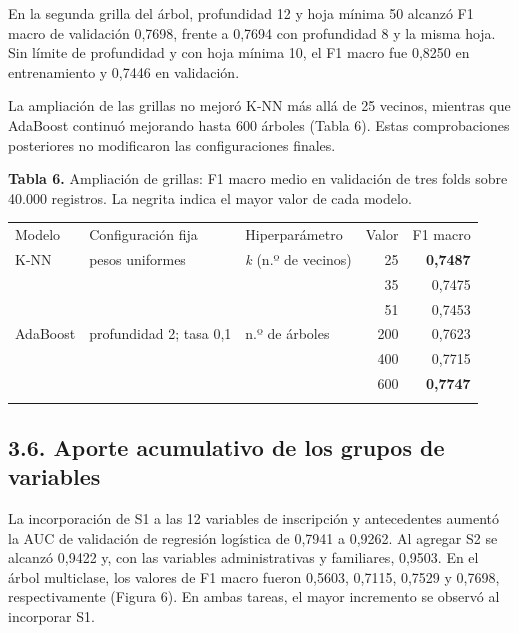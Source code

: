 \documentclass[10pt,a4paper]{article}
\newenvironment{tabla}{\par\begingroup\small
  \setlength{\LTpre}{2pt}\setlength{\LTpost}{2pt}\setlength{\tabcolsep}{4.5pt}
  \renewcommand{\arraystretch}{1.08}}{\endgroup\par}
\newcommand{\epigrafetabla}[1]{\noindent\begin{minipage}{\linewidth}\small\justifying\noindent #1\end{minipage}\par\vspace{2pt}}
\renewcommand{\toprule}{\specialrule{1pt}{2pt}{2pt}}
\renewcommand{\bottomrule}{\specialrule{1pt}{2pt}{0pt}}
\renewcommand{\midrule}{\specialrule{.5pt}{2pt}{2pt}}
\begin{document}
En la segunda grilla del árbol, profundidad 12 y hoja mínima 50 alcanzó F1 macro de validación 0,7698, frente a 0,7694 con profundidad 8 y la misma
hoja. Sin límite de profundidad y con hoja mínima 10, el F1 macro fue 0,8250 en entrenamiento y 0,7446 en validación.

La ampliación de las grillas no mejoró K-NN más allá de 25 vecinos, mientras que AdaBoost continuó mejorando hasta 600 árboles (Tabla 6). Estas
comprobaciones posteriores no modificaron las configuraciones finales.

\begin{table}[!htbp]
\begin{tabla}
\epigrafetabla{\textbf{Tabla 6.} Ampliación de grillas: F1 macro medio en validación de
tres folds sobre 40.000 registros. La negrita indica el mayor valor de
cada modelo.}
\begin{tabular*}{\linewidth}{@{\extracolsep{\fill}}lllrr@{}}
\toprule\noalign{}
Modelo & Configuración fija & Hiperparámetro & Valor & F1 macro \\
\midrule\noalign{}
K-NN & pesos uniformes & \emph{k} (n.º de vecinos) & 25 &
\textbf{0,7487} \\
& & & 35 & 0,7475 \\
& & & 51 & 0,7453 \\
AdaBoost & profundidad 2; tasa 0,1 & n.º de árboles & 200 & 0,7623 \\
& & & 400 & 0,7715 \\
& & & 600 & \textbf{0,7747} \\
\bottomrule
\end{tabular*}
\end{tabla}
\end{table}

\hypertarget{aporte-acumulativo-de-los-grupos-de-variables}{%
\subsection{3.6. Aporte acumulativo de los grupos de variables}\label{aporte-acumulativo-de-los-grupos-de-variables}}

La incorporación de S1 a las 12 variables de inscripción y antecedentes aumentó la AUC de validación de regresión logística de 0,7941 a 0,9262. Al
agregar S2 se alcanzó 0,9422 y, con las variables administrativas y familiares, 0,9503. En el árbol multiclase, los valores de F1 macro fueron 0,5603,
0,7115, 0,7529 y 0,7698, respectivamente (Figura 6). En ambas tareas, el mayor incremento se observó al incorporar S1.
\end{document}
